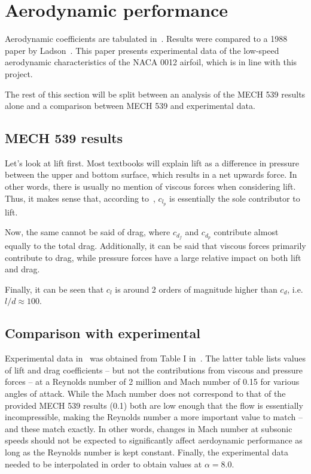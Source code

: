 \section{Aerodynamic performance}
Aerodynamic coefficients are tabulated in~. Results were compared
to a 1988 paper by Ladson~\cite{ladson1988effects}. This paper presents experimental data of
the low-speed aerodynamic characteristics of the NACA 0012 airfoil, which is
in line with this project.

The rest of this section will be split between an analysis of the MECH 539 results alone and
a comparison between MECH 539 and experimental data.


\subsection{MECH 539 results}
Let's look at lift first. Most textbooks will explain lift as a difference in pressure
between the upper and bottom surface, which results in a net upwards force. In other words,
there is usually no mention of viscous forces when considering lift. Thus, it makes sense
that, according to~, $c_{l_p}$ is essentially the sole contributor to
lift.

Now, the same cannot be said of drag, where $c_{d_f}$ and $c_{d_p}$ contribute almost
equally to the total drag. Additionally, it can be said that viscous forces
primarily contribute to drag, while pressure forces have a large relative impact on both
lift and drag.

Finally, it can be seen that $c_l$ is around 2 orders of magnitude higher than $c_d$, i.e.
$l/d \approx 100$.
\subsection{Comparison with experimental}
Experimental data in~ was obtained from Table I
in~\cite{ladson1988effects}. The latter table lists values of lift and drag coefficients
-- but not the contributions from viscous and pressure forces -- at a Reynolds number of 2
million and Mach number of 0.15 for various angles of attack. While the Mach number
does not correspond to that of the provided MECH 539 results (0.1) both are low enough
that the flow is essentially incompressible, making the Reynolds number a more important
value to match -- and these match exactly. In other words, changes in Mach number
at subsonic speeds should not be expected to significantly affect aerdoynamic performance
as long as the Reynolds number is kept constant.  Finally, the experimental
data needed to be interpolated in order to obtain values at $\alpha = 8.0$.

